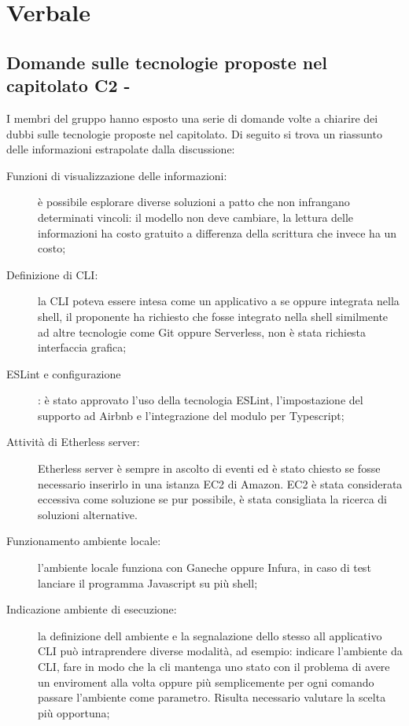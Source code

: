 \section{Verbale}
\subsection{Domande sulle tecnologie proposte nel capitolato C2 - \NomeProgetto}
I membri del gruppo hanno esposto una serie di domande volte a chiarire dei dubbi sulle tecnologie proposte nel capitolato.
Di seguito si trova un riassunto delle informazioni estrapolate dalla discussione:
\begin{description}
	\item[Funzioni di visualizzazione delle informazioni:] è possibile esplorare diverse soluzioni a patto che non infrangano determinati vincoli: il modello non deve cambiare, la lettura delle informazioni ha costo gratuito a differenza della scrittura che invece ha un costo;
	\item[Definizione di CLI:] la CLI poteva essere intesa come un applicativo a se oppure integrata nella shell, il proponente ha richiesto che fosse integrato nella shell similmente ad altre tecnologie come Git oppure Serverless, non è stata richiesta interfaccia grafica;
	\item[ESLint e configurazione]: è stato approvato l'uso della tecnologia ESLint, l'impostazione del supporto ad Airbnb e l'integrazione del modulo per Typescript;
	\item[Attività di Etherless server:] Etherless server è sempre in ascolto di eventi ed è stato chiesto se fosse necessario inserirlo in una istanza EC2 di Amazon. EC2 è stata considerata eccessiva come soluzione se pur possibile, è stata consigliata la ricerca di soluzioni alternative.
	\item[Funzionamento ambiente locale: ] l'ambiente locale funziona con Ganeche oppure Infura, in caso di test lanciare il programma Javascript su più shell;
	\item[Indicazione ambiente di esecuzione:] la definizione dell ambiente e la segnalazione dello stesso all applicativo CLI può intraprendere diverse modalità, ad esempio: indicare l'ambiente da CLI, fare in modo che la cli mantenga uno stato con il problema di avere un enviroment alla volta oppure più semplicemente per ogni comando passare l'ambiente come parametro. Risulta necessario valutare la scelta più opportuna;

\end{description}

